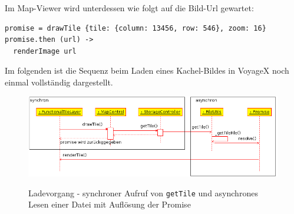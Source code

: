 \enlargethispage{3\baselineskip} %
Im Map-Viewer wird unterdessen wie folgt auf die Bild-Url gewartet:
\lstset{language=CoffeeScript}
\begin{lstlisting}[frame=single,xleftmargin=0pt]
promise = drawTile {tile: {column: 13456, row: 546}, zoom: 16}
promise.then (url) ->
  renderImage url
\end{lstlisting}
\vspace{2ex}
Im folgenden ist die Sequenz beim Laden eines Kachel-Bildes in VoyageX noch einmal vollständig dargestellt. %
  \begin{figure}[H]
      \centering
	  \includegraphics[scale=0.7]{bilder/uml/loadTile.png}\\ 
  	  \caption{Ladevorgang - synchroner Aufruf von \texttt{getTile} und asynchrones Lesen einer Datei mit Auflösung der Promise}
  \end{figure}
